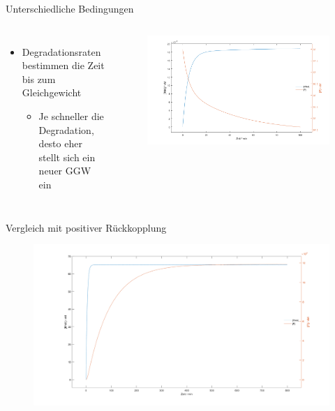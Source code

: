 \documentclass[11pt,aspectratio=169,reqno]{beamer}
\begin{document}
\begin{frame}{Unterschiedliche Bedingungen}
    \begin{columns}
        \begin{itemize}
            \item Degradationsraten bestimmen die Zeit bis zum Gleichgewicht
            \begin{itemize}
                \item Je schneller die Degradation, desto eher stellt sich ein neuer GGW ein
            \end{itemize}
        \end{itemize}
        
        \begin{figure}
            \centering
            \includegraphics[width=\linewidth]{images/simulations/negative_autoregulation_high_protein.m.png}
        \end{figure}
    \end{columns}
\end{frame}

\begin{frame}{Vergleich mit positiver Rückkopplung}
\begin{figure}
    \centering
    \includegraphics[width=\textwidth]{images/simulations/positive_autoregulation_basic.m.png}
\end{figure}
\end{frame}
\end{document}
